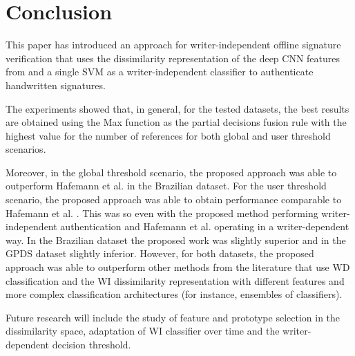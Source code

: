 \documentclass[conference]{IEEEtran}
\begin{document}
\section{Conclusion}
\label{sec:conclusion}
This paper has introduced an approach for writer-independent offline signature verification that uses the dissimilarity representation of the deep CNN features from \cite{hafemann:17} and a single SVM as a writer-independent classifier to authenticate handwritten signatures. 


The experiments showed that, in general, for the tested datasets, the best results are obtained using the Max function as the partial decisions fusion rule with the highest value for the number of references for both global and user threshold scenarios.


Moreover, in the global threshold scenario, the proposed approach was able to outperform Hafemann et al. \cite{hafemann:17} in the Brazilian dataset. For the user threshold scenario, the proposed approach was able to obtain performance comparable to Hafemann et al. \cite{hafemann:17}. This was so even with the proposed method performing writer-independent authentication and Hafemann et al. \cite{hafemann:17} operating in a writer-dependent way. In the Brazilian dataset the proposed work was slightly superior and in the GPDS dataset slightly inferior. However, for both datasets, the proposed approach was able to outperform other methods from the literature that use WD classification and the WI dissimilarity representation with different features and more complex classification architectures (for instance, ensembles of classifiers). 


Future research will include the study of feature and prototype selection in the dissimilarity space, adaptation of WI classifier over time and the writer-dependent decision threshold. 


 


\end{document}
